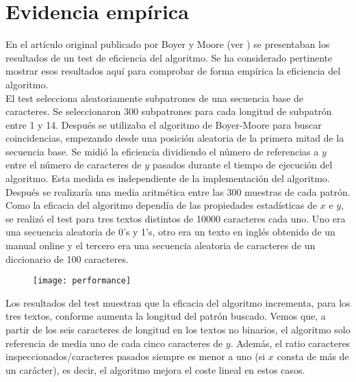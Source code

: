 
\section{Evidencia empírica}
En el artículo original publicado por Boyer y Moore (ver \cite{articulo1}) 
se presentaban los resultados de un test de eficiencia del algoritmo. Se ha considerado pertinente mostrar esos resultados aquí para comprobar de forma empírica la eficiencia del algoritmo.\\

El test selecciona aleatoriamente subpatrones de una secuencia base de caracteres. Se seleccionaron 300 subpatrones para cada longitud de subpatrón entre 1 y 14. Después se utilizaba el algoritmo de Boyer-Moore para buscar coincidencias, empezando desde una posición aleatoria de la primera mitad de la secuencia base. Se midió la eficiencia dividiendo el número de referencias a $y$ entre el número de caracteres de $y$ pasados durante el tiempo de ejecución del algoritmo. Esta medida es independiente de la implementación del algoritmo. Después se realizaría una media aritmética entre las 300 muestras de cada patrón.\\

Como la eficacia del algoritmo dependía de las propiedades estadísticas de $x$ e $y$, se realizó el test para tres textos distintos de 10000 caracteres cada uno. Uno era una secuencia aleatoria de 0's y 1's, otro era un texto en inglés obtenido de un manual online y el tercero era una secuencia aleatoria de caracteres de un diccionario de 100 caracteres. \\

\begin{figure}[H]
  \centering
    \texttt{[image: performance]}
	\label{performance}
\end{figure}

Los resultados del test muestran que la eficacia del algoritmo incrementa, para los tres textos, conforme aumenta la longitud del patrón buscado. Vemos que, a partir de los seis caracteres de longitud en los textos no binarios, el algoritmo solo referencia de media uno de cada cinco caracteres de $y$. Además, el ratio caracteres inspeccionados/caracteres pasados siempre es menor a uno (si $x$ consta de más de un carácter), es decir, el algoritmo mejora el coste lineal en estos casos.
